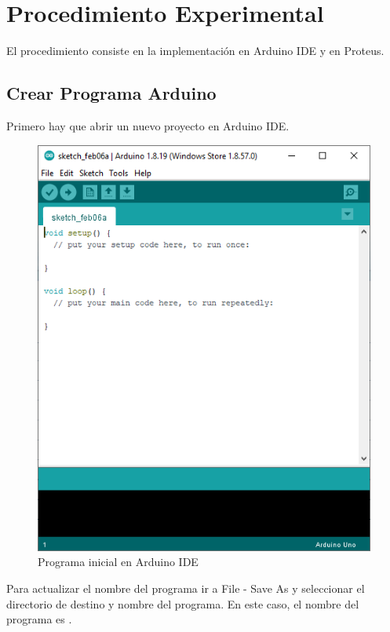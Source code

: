 \documentclass{article}
\begin{document}
    \section{Procedimiento Experimental}

    El procedimiento consiste en la implementación en Arduino IDE y en Proteus.

    \subsection{Crear Programa Arduino}

    Primero hay que abrir un nuevo proyecto en Arduino IDE.

    \begin{figure}[H]
        \centering
        \includegraphics[width=0.3\paperwidth]{images/arduino-1.png}
        \caption{Programa inicial en Arduino IDE}
    \end{figure}

    Para actualizar el nombre del programa ir a File - Save As y seleccionar
    el directorio de destino y nombre del programa. En este caso, el nombre
    del programa es .
\end{document}
